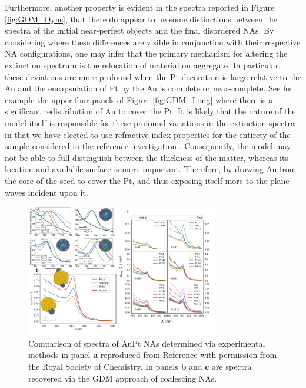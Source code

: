Furthermore, another property is evident in the spectra reported in Figure \ref{fig:GDM_Dyns}, that there do appear to be some distinctions between the spectra of the initial near-perfect objects and the final disordered NAs. By considering  where these differences are visible in conjunction with their respective NA configurations, one may infer that the primary mechanism for altering the extinction spectrum is the relocation of material on aggregate. In particular, these deviations are more profound when the Pt decoration is large relative to the Au and the encapsulation of Pt by the Au is complete or near-complete. See for example the upper four panels of Figure \ref{fig:GDM_Long} where there is a significant redistribution of Au to cover the Pt. It is likely that the nature of the model itself is responsible for these profound variations in the extinction spectra in that we have elected to use refractive index properties for the entirety of the sample considered in the reference investigation \cite{PhysRevB.6.4370}. Consequently, the model may not be able to full distinguish between the thickness of the matter, whereas its location and available surface is more important. Therefore, by drawing Au from the core of the seed to cover the Pt, and thus exposing itself more to the plane waves incident upon it.

\begin{figure}[ht!]
    \centering
    \includegraphics[width=0.75\textwidth]{figures/MD/Exp_Comp.pdf}
    \caption{Comparison of spectra of AuPt NAs determined via experimental methods in panel \textbf{a} reproduced from Reference \cite{Jorge2019} with permission from the Royal Society of Chemistry. In panels \textbf{b} and \textbf{c} are spectra recovered via the GDM approach of coalescing NAs.}
    \label{fig:exp_spec}
\end{figure}

